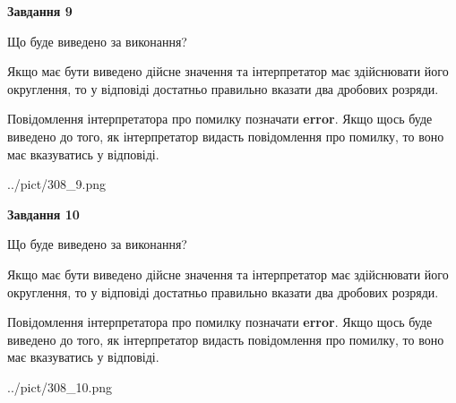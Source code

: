 \documentclass[12pt, ukrainian]{article}
\begin{document}
{\begin {Large}
{\begin {center}\textbf{Завдання 9}\end {center}}\par
Що буде виведено за виконання? \par

Якщо має бути виведено дійсне значення та інтерпретатор має здійснювати його округлення, 
то у відповіді достатньо правильно вказати два дробових розряди.

Повідомлення інтерпретатора про помилку позначати \textbf{error}.
Якщо щось буде виведено до того, як інтерпретатор видасть повідомлення про помилку, 
то воно має вказуватись у відповіді. \par

\begin{center}
	{../pict/308_9.png}
\end{center}
\newpage

{\begin {center}\textbf{Завдання 10}\end {center}}\par
Що буде виведено за виконання? \par

Якщо має бути виведено дійсне значення та інтерпретатор має здійснювати його округлення, 
то у відповіді достатньо правильно вказати два дробових розряди.

Повідомлення інтерпретатора про помилку позначати \textbf{error}.
Якщо щось буде виведено до того, як інтерпретатор видасть повідомлення про помилку, 
то воно має вказуватись у відповіді. \par

\begin{center}
	{../pict/308_10.png}
\end{center}
\newpage

\end {Large}}
\end{document}

